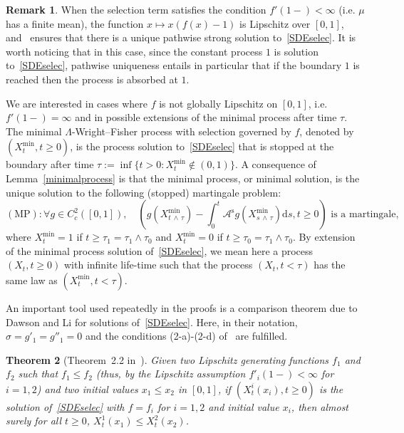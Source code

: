 \documentclass[10pt]{amsart}
\newtheorem{theo}{Theorem}[section]
\theoremstyle{definition}\newtheorem{defi}[theo]{Definition}\newtheorem{rema}[theo]{Remark}\newtheorem{exam}[theo]{Example}\newtheorem{exem}[theo]{Example}\newtheorem{nota}[theo]{Notation}
\newcommand{\ddr}{\mathrm{d}}
\newcommand{\rms}{\mathrm{s}}
\newcommand{\MP}{\mathrm{MP}}
\newcommand{\clA}{\mathcal{A}}
\let\oldforall\forall
\renewcommand*{\forall}{\mathrel{\oldforall}}
\begin{document}
\begin{rema}\label{Lipschitzrem}
When the selection term satisfies the condition $f'(1-)<\infty$ (i.e. $\mu$ has a finite mean), the function $x\mapsto x(f(x)-1)$ is Lipschitz over $[0,1]$, and~\cite[Theorem~2.1]{DawsonLi} ensures that there is a unique pathwise strong solution to~\eqref{SDEselec}. It is worth noticing that in this case, since the constant process $1$ is solution to~\eqref{SDEselec}, pathwise uniqueness entails in particular that if the boundary $1$ is reached then the process is absorbed at $1$.
\end{rema}

We are interested in cases where $f$ is not globally Lipschitz on $[0,1]$, i.e. $f'(1-)=\infty$ and in possible extensions of the minimal process after time $\tau$. The minimal $\Lambda$-Wright--Fisher process with selection governed by $f$, denoted by $(X_t^{\min},t\geq 0)$, is the process solution to~\eqref{SDEselec} that is stopped at the boundary after time $\tau:=\inf\{t>0: X^{\min}_t \notin (0,1)\}$. A consequence of Lemma~\ref{minimalprocess} is that the minimal process, or minimal solution, is the unique solution to the following (stopped) martingale problem:
\[
(\MP): \forall g\in C^2_c([0,1]), \quad \left(g\left(X^{\min}_{t\,\wedge\,\tau}\right)-\int_{0}^{t}\clA^{\rms}g\left(X^{\min}_{s\,\wedge\,\tau}\right)\ddr s, t\geq 0\right) \text{ is a martingale,}
\]
where $X^{\min}_{t}=1$ if $t\geq \tau_1=\tau_1\wedge \tau_0$ and $X^{\min}_{t}=0$ if $t\geq \tau_0=\tau_1\wedge \tau_0$. By extension of the minimal process solution of~\eqref{SDEselec}, we mean here a process $(X_t,t\geq 0)$ with infinite life-time such that the process $(X_{t},t<\tau)$ has the same law as $(X^{\min}_{t},t<\tau)$.

An important tool used repeatedly in the proofs is a comparison theorem due to Dawson and Li for solutions of~\eqref{SDEselec}. Here, in their notation, $\sigma=g'_1=g''_1=0$ and the conditions (2-a)-(2-d) of~\cite[Theorem~2.2]{DawsonLi} are fulfilled.

\begin{theo}[Theorem~2.2 in~\cite{DawsonLi}]\label{comparisontheorem}
Given two Lipschitz generating functions $f_1$ and $f_2$ such that $f_1\leq f_2$ (thus, by the Lipschitz assumption $f'_i(1-)<\infty$ for $i=1,2$) and two initial values $x_1\leq x_2$ in $[0,1]$, if $(X^i_t(x_i),t\geq 0)$ is the solution of~\eqref{SDEselec} with $f=f_i$ for $i=1,2$ and initial value $x_i$, then almost surely for all $t\geq 0$, $X^{1}_t(x_1)\leq X^{2}_t(x_2)$.
\end{theo}
\end{document}
